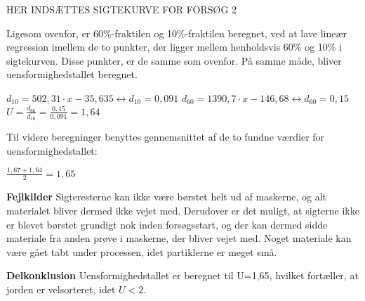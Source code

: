 HER INDSÆTTES SIGTEKURVE FOR FORSØG 2




\newline
\newline
Ligesom ovenfor, er 60\%-fraktilen og 10\%-fraktilen beregnet, ved at lave lineær regression imellem de to punkter, der ligger mellem henholdsvis 60\% og 10\% i sigtekurven. Disse punkter, er de samme som ovenfor. På samme måde, bliver uensformighedstallet beregnet. 

\begin{center}
	$d_{10}=502,31\cdot x - 35,635 \leftrightarrow d_{10}=0,091$
	\newline
	\newline
	$d_{60}=1390,7\cdot x - 146,68 \leftrightarrow d_{60}=0,15$
	\newline
	\newline 
	$U = \frac{d_{60}}{d_{10}} = \frac{0,15}{0,091} = 1,64$
\end{center}

Til videre beregninger benyttes gennemsnittet af de to fundne værdier for uensformighedstallet: 

\begin{center}
	$\frac{1,67+1,64}{2}=1,65$
\end{center}

\textbf{Fejlkilder}
\newline
Sigteresterne kan ikke være børstet helt ud af maskerne, og alt materialet bliver dermed ikke vejet med. Derudover er det muligt, at sigterne ikke er blevet børstet grundigt nok inden forsøgsstart, og der kan dermed sidde materiale fra anden prøve i maskerne, der bliver vejet med.
\newline
Noget materiale kan være gået tabt under processen, idet partiklerne er meget små. 
\newline
\newline

\textbf{Delkonklusion}
\newline
Uensformighedstallet er beregnet til U=1,65, hvilket fortæller, at jorden er velsorteret, idet $U<2$.  